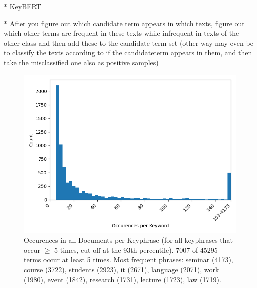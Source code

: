 * KeyBERT




* After you figure out which candidate term appears in which texts, figure out which other terms are frequent in these texts while infrequent in texts of the other class and then add these to the candidate-term-set (other way may even be to classify the texts according to if the candidateterm appears in them, and then take the misclassified one also as positive samples)

\begin{figure}[H]
	\centering
	\includegraphics[width=\figwidth]{graphics/figures/keyphrases_histogram.png}
	\caption[Occurences in all Documents per Keyphrase]{
		\label{fig:keyphrases_histogram}
		Occurences in all Documents per Keyphrase (for all keyphrases that occur $\geq$ 5 times, cut off at the 93th percentile).
		7007 of 45295 terms occur at least 5 times.
		Most frequent phrases: seminar (4173), course (3722), students (2923), it (2671), language (2071), work (1980), event (1842), research (1731), lecture (1723), law (1719).
		}
\end{figure}


